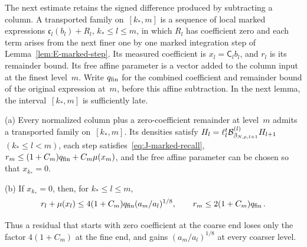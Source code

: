 The next estimate retains the signed difference produced by subtracting a column. A transported family on~$[k_*,m]$ is a sequence of local marked expressions $\mathfrak c_l(b_l)+R_l$, $k_*\le l\le m$, in which $R_l$ has coefficient zero and each term arises from the next finer one by one marked integration step of Lemma~\ref{lem:E-marked-step}. Its measured coefficient is $x_l=\mathsf C_l b_l$, and $r_l$ is its remainder bound. Its free affine parameter is a vector added to the column input at the finest level~$m$. Write $q_{\rm fin}$ for the combined coefficient and remainder bound of the original expression at~$m$, before this affine subtraction. In the next lemma, the interval~$[k_*,m]$ is sufficiently late.

\begin{lemma}\label{lem:J-signed-local}
(a) Every normalized column plus a zero-coefficient remainder at level~$m$ admits a transported family on~$[k_*,m]$. Its densities satisfy $H_l=\ell_l^t\mathcal{B}^{(l)}_{\beta_{N,p,l+1}}H_{l+1}$ $(k_*\le l<m)$, each step satisfies~\eqref{eq:J-marked-recall}, $r_m\le(1+C_m)q_{\rm fin}+C_m\mu(x_m)$, and the free affine parameter can be chosen so that $x_{k_*}=0$.

(b) If $x_{k_*}=0$, then, for $k_*\le l\le m$,
\begin{equation*}
r_l+\mu(x_l)\le4(1+C_m)q_{\rm fin}(a_m/a_l)^{1/8},\qquad
r_m\le2(1+C_m)q_{\rm fin}\,.
\end{equation*}
\end{lemma}
Thus a residual that starts with zero coefficient at the coarse end loses only the factor $4(1+C_m)$ at the fine end, and gains $(a_m/a_l)^{1/8}$ at every coarser level.

